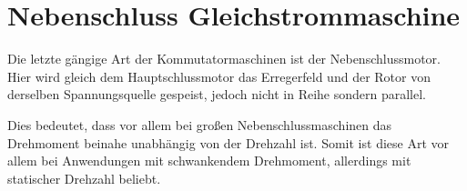 \section{Nebenschluss Gleichstrommaschine}
\label{neben}

Die letzte gängige Art der Kommutatormaschinen ist der Nebenschlussmotor.
Hier wird gleich dem Hauptschlussmotor das Erregerfeld und der Rotor von derselben Spannungsquelle gespeist, jedoch nicht in Reihe sondern parallel.

Dies bedeutet, dass vor allem bei großen Nebenschlussmaschinen das Drehmoment beinahe unabhängig von der Drehzahl ist.
Somit ist diese Art vor allem bei Anwendungen mit schwankendem Drehmoment, allerdings mit statischer Drehzahl beliebt.

\cite{dcdewiki:208635995}